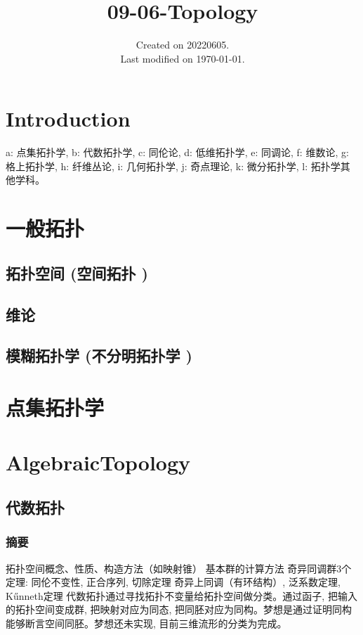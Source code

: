 \documentclass[UTF8]{../09-Mathematics}
\begin{document}
\title{09-06-Topology}
\date{Created on 20220605.\\   Last modified on \today.}
\maketitle
\tableofcontents


\chapter{Introduction}

a: 点集拓扑学, 
b: 代数拓扑学, 
c: 同伦论, 
d: 低维拓扑学,
e: 同调论, 
f: 维数论, 
g: 格上拓扑学, 
h: 纤维丛论, 
i: 几何拓扑学, 
j: 奇点理论, 
k: 微分拓扑学, 
l: 拓扑学其他学科。



\chapter{一般拓扑}
    \section{拓扑空间 (空间拓扑 )}
    \section{维论}
    \section{模糊拓扑学 (不分明拓扑学 )}


\chapter{点集拓扑学}






\chapter{AlgebraicTopology}

\section{代数拓扑}

\subsection{摘要}
拓扑空间概念、性质、构造方法（如映射锥）
基本群的计算方法
奇异同调群3个定理: 同伦不变性, 正合序列, 切除定理
奇异上同调（有环结构）, 泛系数定理, K\H unneth定理
代数拓扑通过寻找拓扑不变量给拓扑空间做分类。通过函子, 把输入的拓扑空间变成群, 把映射对应为同态, 把同胚对应为同构。梦想是通过证明同构能够断言空间同胚。梦想还未实现, 目前三维流形的分类为完成。
\end{document}
